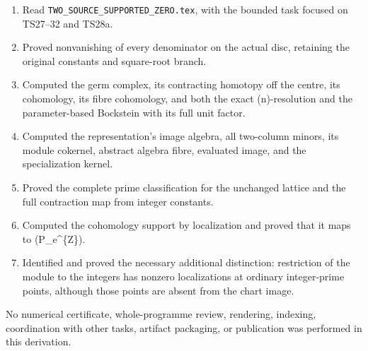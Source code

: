\documentclass[
]{article}
\providecommand{\tightlist}{%
  \setlength{\itemsep}{0pt}\setlength{\parskip}{0pt}}
\begin{document}
\begin{enumerate}
\def\labelenumi{\arabic{enumi}.}
\tightlist
\item
  Read \texttt{TWO\_SOURCE\_SUPPORTED\_ZERO.tex}, with the bounded task
  focused on TS27--32 and TS28a.
\item
  Proved nonvanishing of every denominator on the actual disc, retaining
  the original constants and square-root branch.
\item
  Computed the germ complex, its contracting homotopy off the centre,
  its cohomology, its fibre cohomology, and both the exact
  (n)-resolution and the parameter-based Bockstein with its full unit
  factor.
\item
  Computed the representation's image algebra, all two-column minors,
  its module cokernel, abstract algebra fibre, evaluated image, and the
  specialization kernel.
\item
  Proved the complete prime classification for the unchanged lattice and
  the full contraction map from integer constants.
\item
  Computed the cohomology support by localization and proved that it
  maps to (P\_e\^{}\{\mathbb Z\}).
\item
  Identified and proved the necessary additional distinction:
  restriction of the module to the integers has nonzero localizations at
  ordinary integer-prime points, although those points are absent from
  the chart image.
\end{enumerate}

No numerical certificate, whole-programme review, rendering, indexing,
coordination with other tasks, artifact packaging, or publication was
performed in this derivation.
\end{document}
